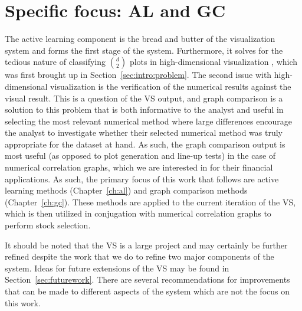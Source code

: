 \section{Specific focus: AL and GC}
\label{sec:visualizer:focus}

The active learning component is the bread and butter of the visualization 
system and forms the first stage of the system. Furthermore, it solves for the 
tedious nature of classifying $d \choose 2$ plots in high-dimensional 
visualization , which was first brought up in Section~\ref{sec:intro:problem}. 
The second issue with high-dimensional visualization is the verification of the 
numerical results against the visual result. This is a question of the VS 
output, and graph comparison is a solution to this problem that is both 
informative to the analyst and useful in selecting the most relevant numerical 
method where large differences encourage the analyst to investigate whether 
their selected numerical method was truly appropriate for the dataset at hand. 
As such, the graph comparison output is most useful (as opposed to plot 
generation and line-up tests) in the case of numerical correlation 
graphs, which we are interested in for their financial applications. As such, 
the primary focus of this work that follows are active learning methods 
(Chapter~\ref{ch:al}) and graph comparison methods (Chapter~\ref{ch:gc}). These 
methods are applied to the current iteration of the VS, which is then utilized 
in conjugation with numerical correlation graphs to perform stock selection.

It should be noted that the VS is a large project and may certainly be further 
refined despite the work that we do to refine two major components of the 
system. Ideas for future extensions of the VS may be found in 
Section~\ref{sec:futurework}. There are several recommendations for 
improvements that can be made to different aspects of the system which are not 
the focus on this work.